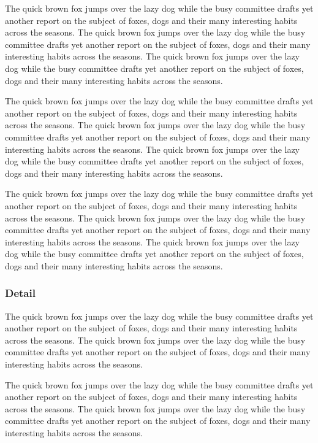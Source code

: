 \documentclass{article}
\begin{document}
The quick brown fox jumps over the lazy dog while the busy committee drafts yet another report on the subject of foxes, dogs and their many interesting habits across the seasons. The quick brown fox jumps over the lazy dog while the busy committee drafts yet another report on the subject of foxes, dogs and their many interesting habits across the seasons. The quick brown fox jumps over the lazy dog while the busy committee drafts yet another report on the subject of foxes, dogs and their many interesting habits across the seasons. 

The quick brown fox jumps over the lazy dog while the busy committee drafts yet another report on the subject of foxes, dogs and their many interesting habits across the seasons. The quick brown fox jumps over the lazy dog while the busy committee drafts yet another report on the subject of foxes, dogs and their many interesting habits across the seasons. The quick brown fox jumps over the lazy dog while the busy committee drafts yet another report on the subject of foxes, dogs and their many interesting habits across the seasons. 

The quick brown fox jumps over the lazy dog while the busy committee drafts yet another report on the subject of foxes, dogs and their many interesting habits across the seasons. The quick brown fox jumps over the lazy dog while the busy committee drafts yet another report on the subject of foxes, dogs and their many interesting habits across the seasons. The quick brown fox jumps over the lazy dog while the busy committee drafts yet another report on the subject of foxes, dogs and their many interesting habits across the seasons. 

\subsubsection{Detail}
The quick brown fox jumps over the lazy dog while the busy committee drafts yet another report on the subject of foxes, dogs and their many interesting habits across the seasons. The quick brown fox jumps over the lazy dog while the busy committee drafts yet another report on the subject of foxes, dogs and their many interesting habits across the seasons. 

The quick brown fox jumps over the lazy dog while the busy committee drafts yet another report on the subject of foxes, dogs and their many interesting habits across the seasons. The quick brown fox jumps over the lazy dog while the busy committee drafts yet another report on the subject of foxes, dogs and their many interesting habits across the seasons. 
\end{document}
